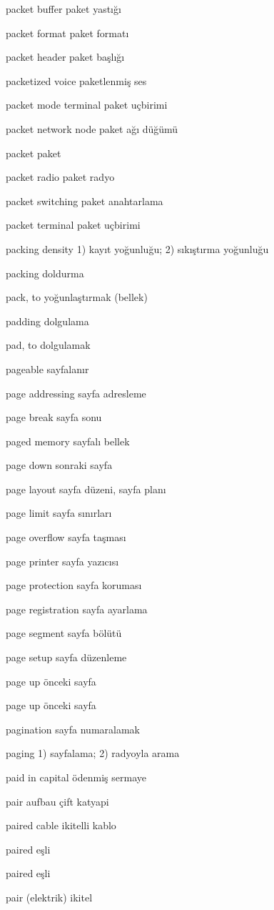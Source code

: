 \documentclass[12pt,fleqn]{article}\usepackage{../../common}
\begin{document}
packet buffer paket yastığı

packet format paket formatı

packet header paket başlığı

packetized voice paketlenmiş ses

packet mode terminal paket uçbirimi

packet network node paket ağı düğümü

packet paket

packet radio paket radyo

packet switching paket anahtarlama

packet terminal paket uçbirimi

packing density 1) kayıt yoğunluğu; 2) sıkıştırma yoğunluğu

packing doldurma

pack, to yoğunlaştırmak (bellek)

padding dolgulama

pad, to dolgulamak

pageable sayfalanır

page addressing sayfa adresleme

page break sayfa sonu

paged memory sayfalı bellek

page down sonraki sayfa

page layout sayfa düzeni, sayfa planı

page limit sayfa sınırları

page overflow sayfa taşması

page printer sayfa yazıcısı

page protection sayfa koruması

page registration sayfa ayarlama

page segment sayfa bölütü

page setup sayfa düzenleme

page up önceki sayfa

page up önceki sayfa

pagination sayfa numaralamak

paging 1) sayfalama; 2) radyoyla arama

paid in capital ödenmiş sermaye

pair aufbau çift katyapi

paired cable ikitelli kablo

paired eşli

paired eşli

pair (elektrik) ikitel
\end{document}
